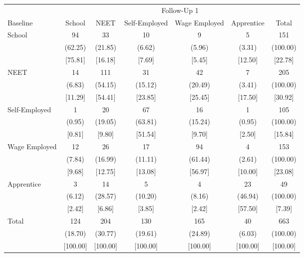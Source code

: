{
\def\sym#1{\ifmmode^{#1}\else\(^{#1}\)\fi}
\begin{tabular}{l*{6}{c}}
\hline\hline
            &\multicolumn{6}{c}{Follow-Up 1}                                              \\
Baseline    &      School&        NEET&Self-Employed&Wage Employed&  Apprentice&       Total\\
\hline
School      &          94&          33&          10&           9&           5&         151\\
            &     (62.25)&     (21.85)&      (6.62)&      (5.96)&      (3.31)&    (100.00)\\
            &     [75.81]&     [16.18]&      [7.69]&      [5.45]&     [12.50]&     [22.78]\\
NEET        &          14&         111&          31&          42&           7&         205\\
            &      (6.83)&     (54.15)&     (15.12)&     (20.49)&      (3.41)&    (100.00)\\
            &     [11.29]&     [54.41]&     [23.85]&     [25.45]&     [17.50]&     [30.92]\\
Self-Employed&           1&          20&          67&          16&           1&         105\\
            &      (0.95)&     (19.05)&     (63.81)&     (15.24)&      (0.95)&    (100.00)\\
            &      [0.81]&      [9.80]&     [51.54]&      [9.70]&      [2.50]&     [15.84]\\
Wage Employed&          12&          26&          17&          94&           4&         153\\
            &      (7.84)&     (16.99)&     (11.11)&     (61.44)&      (2.61)&    (100.00)\\
            &      [9.68]&     [12.75]&     [13.08]&     [56.97]&     [10.00]&     [23.08]\\
Apprentice  &           3&          14&           5&           4&          23&          49\\
            &      (6.12)&     (28.57)&     (10.20)&      (8.16)&     (46.94)&    (100.00)\\
            &      [2.42]&      [6.86]&      [3.85]&      [2.42]&     [57.50]&      [7.39]\\
Total       &         124&         204&         130&         165&          40&         663\\
            &     (18.70)&     (30.77)&     (19.61)&     (24.89)&      (6.03)&    (100.00)\\
            &    [100.00]&    [100.00]&    [100.00]&    [100.00]&    [100.00]&    [100.00]\\
\hline\hline
\end{tabular}
}
